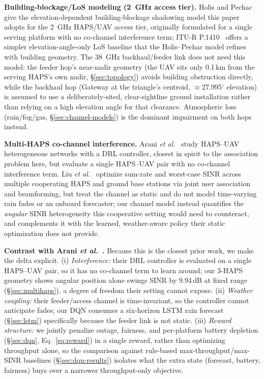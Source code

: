 \documentclass[]{ieeeaccess}
\begin{document}
\textbf{Building-blockage/LoS modeling (2~GHz access tier).} Holis and Pechac~\cite{holispechac2008} give the elevation-dependent building-blockage shadowing model this paper adopts for the 2~GHz HAPS/UAV access tier, originally formulated for a single serving platform with no co-channel interference term; ITU-R P.1410~\cite{itu_p1410} offers a simpler elevation-angle-only LoS baseline that the Holis--Pechac model refines with building geometry. The 38~GHz backhaul/feeder link does not need this model: the feeder hop's near-nadir geometry (the UAV sits only 0.1\,km from the serving HAPS's own nadir, \S\ref{sec:topology}) avoids building obstruction directly, while the backhaul hop (Gateway at the triangle's centroid, $\approx$27.995$^\circ$ elevation) is assumed to use a deliberately-sited, clear-sightline ground installation rather than relying on a high elevation angle for that clearance. Atmospheric loss (rain/fog/gas, \S\ref{sec:channel-models}) is the dominant impairment on both hops instead.

\textbf{Multi-HAPS co-channel interference.} Arani \emph{et al.}~\cite{arani2023} study HAPS--UAV heterogeneous networks with a DRL controller, closest in spirit to the association problem here, but evaluate a single HAPS--UAV pair with no co-channel interference term. Liu \emph{et al.}~\cite{liu2026multihaps} optimize sum-rate and worst-case SINR across multiple cooperating HAPS and ground base stations via joint user association and beamforming, but treat the channel as static and do not model time-varying rain fades or an onboard forecaster; our channel model instead quantifies the \emph{angular} SINR heterogeneity this cooperative setting would need to counteract, and complements it with the learned, weather-aware policy their static optimization does not provide.

\textbf{Contrast with Arani \emph{et al.}~\cite{arani2023}.} Because this is the closest prior work, we make the delta explicit. (i) \emph{Interference:} their DRL controller is evaluated on a single HAPS--UAV pair, so it has no co-channel term to learn around; our 3-HAPS geometry shows angular position alone swings SINR by 9.94\,dB at fixed range (\S\ref{sec:multihaps}), a degree of freedom their setting cannot expose. (ii) \emph{Weather coupling:} their feeder/access channel is time-invariant, so the controller cannot anticipate fades; our DQN consumes a six-horizon LSTM rain forecast (\S\ref{sec:lstm}) specifically because the feeder link is not static. (iii) \emph{Reward structure:} we jointly penalize outage, fairness, and per-platform battery depletion (\S\ref{sec:dqn}, Eq.~\eqref{eq:reward}) in a single reward, rather than optimizing throughput alone, so the comparison against rule-based max-throughput/max-SINR baselines (\S\ref{sec:dqn-results}) isolates what the extra state (forecast, battery, fairness) buys over a narrower throughput-only objective.
\end{document}

